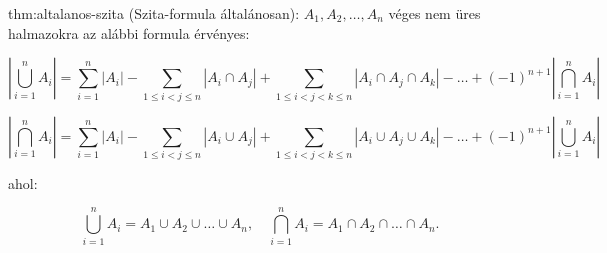 \begin{theorem}{thm:altalanos-szita}
(Szita-formula általánosan): $A_{1},A_{2},\dots,A_{n}$ véges nem
üres halmazokra az alábbi formula érvényes:

\begin{equation}
\left|\bigcup_{i=1}^{n}A_{i}\right|=\sum_{i=1}^{n}|A_{i}|-\sum_{1\leq i<j\leq n}|A_{i}\cap A_{j}|+\sum_{1\leq i<j<k\leq n}|A_{i}\cap A_{j}\cap A_{k}|-\dots+(-1)^{n+1}\left|\bigcap_{i=1}^{n}A_{i}\right|
\end{equation}

\begin{equation}
\left|\bigcap_{i=1}^{n}A_{i}\right|=\sum_{i=1}^{n}|A_{i}|-\sum_{1\leq i<j\leq n}|A_{i}\cup A_{j}|+\sum_{1\leq i<j<k\leq n}|A_{i}\cup A_{j}\cup A_{k}|-\dots+(-1)^{n+1}\left|\bigcup_{i=1}^{n}A_{i}\right|
\end{equation}

ahol:

\[
\bigcup_{i=1}^{n}A_{i}=A_{1}\cup A_{2}\cup\dots\cup A_{n},\quad\bigcap_{i=1}^{n}A_{i}=A_{1}\cap A_{2}\cap\dots\cap A_{n}.
\]
\end{theorem}

